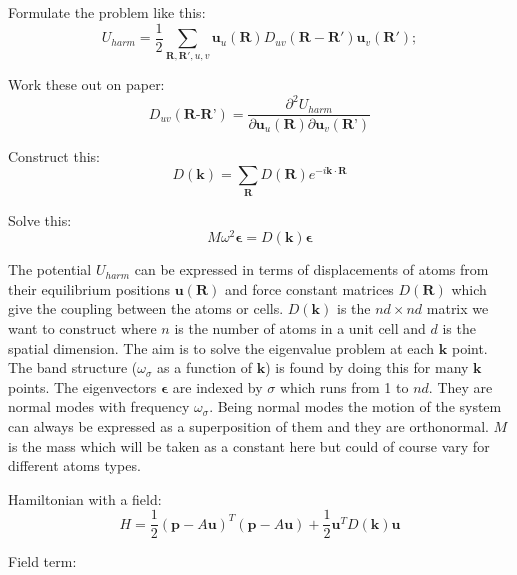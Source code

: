 \documentclass[a5paper,12pt]{article}
\begin{document}

Formulate the problem like this:
\begin{equation}
U_{harm}=\frac{1}{2}\sum_ {\mathbf{R,R'},u,v}^{}\mathbf{u}_u(\mathbf{R})D_{uv}(\mathbf{R-R'})\mathbf{u}_v(\mathbf{R'}); \label{U}
\end{equation}

Work these out on paper:
\begin{equation}
D_{uv} (\textbf{R-R'})=\frac{\partial^2 U_{harm}}{\partial \textbf{u}_u(\textbf{R}) \partial \textbf{u}_v(\textbf{R'})}
\end{equation}

Construct this:
\begin{equation}
D(\mathbf{k})=\sum_{\textbf{R}} D(\mathbf{ R})e^{-i\mathbf{k} \cdot \mathbf{R}}
\end{equation}

Solve this:
\begin{equation}
M \omega^{2} \mathbf{\epsilon} = D(\mathbf{k})
\mathbf{\epsilon}
\end{equation}

\vspace{1cm}
\noindent The potential $U_{harm}$ can be expressed in terms of displacements of atoms from their equilibrium positions $\textbf{u}(\textbf{R})$ and force constant matrices $D(\mathbf{R})$ which give the coupling between the atoms or cells. \noindent $D(\mathbf{k})$ is the $nd\times nd$ matrix we want to construct where $n$ is the number of atoms in a unit cell and $d$ is the spatial dimension. The aim is to solve the eigenvalue problem at each $\mathbf{k}$ point. The band structure ($\omega_\sigma$ as a function of $\mathbf{k}$) is found by doing this for many $\mathbf{k}$ points. The eigenvectors $\mathbf{\epsilon}$ are indexed by $\sigma$ which runs from 1 to $nd$. They are normal modes with frequency $\omega_\sigma$. Being normal modes the motion of the system can always be expressed as a superposition of them and they are orthonormal. $M$ is the mass which will be taken as a constant here but could of course vary for different atoms types.

\newpage

Hamiltonian with a field:
\begin{equation}
H  = \frac{1}{2} (\mathbf{p}-{ A } \mathbf{u})^T (\mathbf{p}-{ A }\mathbf{u}) + \frac{1}{2} \mathbf{u}^T D(\mathbf{k}) \mathbf{u}
\end{equation}

Field term:
\end{document}
